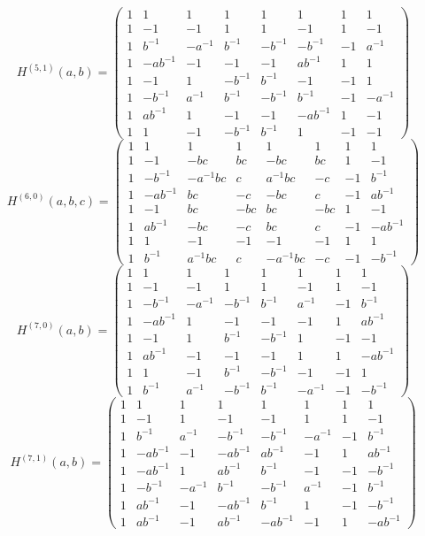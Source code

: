 \documentclass[11pt,a4paper]{article}
\theoremstyle{plain}
\theoremstyle{definition}
\numberwithin{equation}{section}
\begin{document}
\medskip
{\small\setlength{\arraycolsep}{5pt}$$H^{(5,1)}(a,b)=
\begin{pmatrix}
1&1&1&1&1&1&1&1\\1&-1&-1&1&1&-1&1&-1\\1&b^{-1}&-a^{-1}&b^{-1}&-b^{-1}&-b^{-1}&-1&a^{-1}\\1&-ab^{-1}&-1&-1&-1&ab^{-1}&1&1\\1&-1&1&-b^{-1}&b^{-1}&-1&-1&1\\1&-b^{-1}&a^{-1}&b^{-1}&-b^{-1}&b^{-1}&-1&-a^{-1}\\1&ab^{-1}&1&-1&-1&-ab^{-1}&1&-1\\1&1&-1&-b^{-1}&b^{-1}&1&-1&-1
\end{pmatrix}$$}
\medskip
{\small\setlength{\arraycolsep}{5pt}$$H^{(6,0)}(a,b,c)=
\begin{pmatrix}
1&1&1&1&1&1&1&1\\1&-1&-bc&bc&-bc&bc&1&-1\\1&-b^{-1}&-a^{-1}bc&c&a^{-1}bc&-c&-1&b^{-1}\\1&-ab^{-1}&bc&-c&-bc&c&-1&ab^{-1}\\1&-1&bc&-bc&bc&-bc&1&-1\\1&ab^{-1}&-bc&-c&bc&c&-1&-ab^{-1}\\1&1&-1&-1&-1&-1&1&1\\1&b^{-1}&a^{-1}bc&c&-a^{-1}bc&-c&-1&-b^{-1}
\end{pmatrix}$$}
\medskip
{\small\setlength{\arraycolsep}{5pt}$$H^{(7,0)}(a,b)=
\begin{pmatrix}
1&1&1&1&1&1&1&1\\1&-1&-1&1&1&-1&1&-1\\1&-b^{-1}&-a^{-1}&-b^{-1}&b^{-1}&a^{-1}&-1&b^{-1}\\1&-ab^{-1}&1&-1&-1&-1&1&ab^{-1}\\1&-1&1&b^{-1}&-b^{-1}&1&-1&-1\\1&ab^{-1}&-1&-1&-1&1&1&-ab^{-1}\\1&1&-1&b^{-1}&-b^{-1}&-1&-1&1\\1&b^{-1}&a^{-1}&-b^{-1}&b^{-1}&-a^{-1}&-1&-b^{-1}
\end{pmatrix}$$}
\medskip
{\small\setlength{\arraycolsep}{5pt}$$H^{(7,1)}(a,b)=
\begin{pmatrix}
1&1&1&1&1&1&1&1\\1&-1&1&-1&-1&1&1&-1\\1&b^{-1}&a^{-1}&-b^{-1}&-b^{-1}&-a^{-1}&-1&b^{-1}\\1&-ab^{-1}&-1&-ab^{-1}&ab^{-1}&-1&1&ab^{-1}\\1&-ab^{-1}&1&ab^{-1}&b^{-1}&-1&-1&-b^{-1}\\1&-b^{-1}&-a^{-1}&b^{-1}&-b^{-1}&a^{-1}&-1&b^{-1}\\1&ab^{-1}&-1&-ab^{-1}&b^{-1}&1&-1&-b^{-1}\\1&ab^{-1}&-1&ab^{-1}&-ab^{-1}&-1&1&-ab^{-1}
\end{pmatrix}$$}
\end{document}
